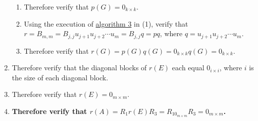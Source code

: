 \documentclass[twocolumn]{article}
\begin{document}
\begin{enumerate}
\begin{enumerate}
					\item Therefore verify that $p(G)=0_{k\times k}$.
					\item Using the execution of \hyperref[sec:algorithm 3]{algorithm 3} in (1), verify that $r=B_{m,m}=B_{j,j}u_{j+1}u_{j+2}\cdots u_m=B_{j,j}q=pq$, where $q=u_{j+1}u_{j+2}\cdots u_m$.
					\item Therefore verify that $r(G)=p(G)q(G)=0_{k\times k}q(G)=0_{k\times k}$.
				\end{enumerate}
				\item Therefore verify that the diagonal blocks of $r(E)$ each equal $0_{i\times i}$, where $i$ is the size of each diagonal block.
				\item Therefore verify that $r(E)=0_{m\times m}$.
				\item \textbf{Therefore verify that $r(A)=R_1r(E)R_3=R_10_{m\times m}R_3=0_{m\times m}$.}
			\end{enumerate}
\end{document}
